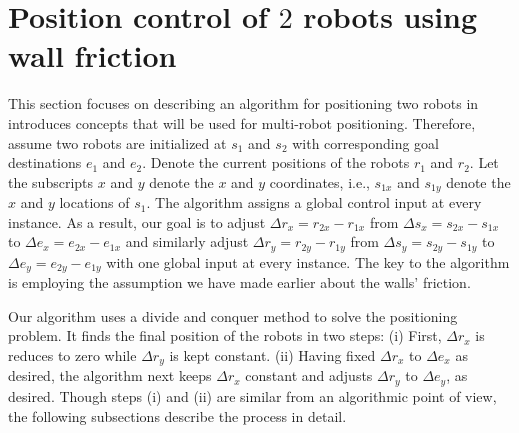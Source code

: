 \section{Position control of $2$ robots using wall friction}
This section focuses on describing an algorithm for positioning two robots in introduces concepts that will be used for multi-robot positioning.
Therefore,  assume two robots are initialized at $s_1$ and $s_2$ with corresponding goal destinations $e_1$ and $e_2$. 
Denote the current positions of the robots  $r_1$ and $r_2$. 
Let the subscripts $x$ and $y$ denote the $x$ and $y$ coordinates, i.e., $s_{1x}$ and $s_{1y}$ denote the $x$ and $y$ locations of $s_1$. 
The algorithm assigns a global control input at every instance.
 As a result, our goal is to adjust 
 $\Delta r_x = r_{2x}-r_{1x}$ from $\Delta s_x = s_{2x}-s_{1x}$ to $\Delta e_x = e_{2x}-e_{1x}$ and similarly adjust 
 $\Delta r_y = r_{2y}-r_{1y}$ from $\Delta s_y = s_{2y}-s_{1y}$ to $\Delta e_y = e_{2y}-e_{1y}$ with one global input at every instance. 
 The key to the algorithm is employing the assumption we have made earlier about the walls' friction. 

Our algorithm uses a divide and conquer method to solve the positioning problem. 
It finds the final position of the robots in two steps: (i) First, $\Delta r_x$ is reduces to zero while  $\Delta r_y$ is kept constant. 
(ii) Having fixed $\Delta r_x$ to $\Delta e_x$ as desired, the  algorithm next keeps $\Delta r_x$ constant and adjusts $\Delta r_y$ to $\Delta e_y$, as desired. 
Though steps (i) and (ii) are similar from an algorithmic point of view, the following subsections describe the process in detail. 

